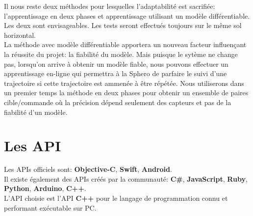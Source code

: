\documentclass[12pt,a4paper,oneside, titlepage]{article}
\begin{document}
Il nous reste deux méthodes pour lesquelles l'adaptabilité est sacrifiée: l'apprentissage en deux phases et apprentissage utilisant un modèle différentiable.
Les deux sont envisageables. Les tests seront effectués toujours sur le même sol horizontal.\\

La méthode avec modèle différentiable apportera un nouveau facteur influençant la réussite du projet: la fiabilité du modèle.
Mais puisque le sytème ne change pas, lorsqu'on arrive à obtenir un modèle fiable, nous pouvons effectuer un apprentissage en-ligne qui permettra à la Sphero de parfaire le suivi d'une trajectoire si cette trajectoire est ammenée à être répétée.
Nous utiliserons dans un premier temps la méthode en deux phases pour obtenir un ensemble de paires cible/commande où la précision dépend seulement des capteurs et pas de la fiabilité d'un modèle.

\section{Les API}
Les APIs officiels sont:\cite{SDKofficiels} \textbf{Objective-C}, \textbf{Swift}, \textbf{Android}.\\
Il existe également des APIs créés par la communauté:\cite{gosphero} \textbf{C\#}, \textbf{JavaScript}, \textbf{Ruby}, \textbf{Python}\cite{pythonAPI}, \textbf{Arduino}, \textbf{C++}\cite{cppAPI}.\\

L'API choisie est l'API \textbf{C++} pour le langage de programmation connu et performant exécutable sur PC.
\end{document}
